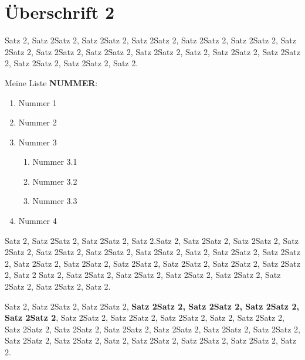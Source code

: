\section{Überschrift 2}

    Satz 2, Satz 2Satz 2, Satz 2Satz 2, Satz 2Satz 2, Satz 2Satz 2, Satz 2Satz 2, Satz 2Satz 2, Satz 2Satz 2, Satz 2Satz 2, Satz 2Satz 2, 
    Satz 2, Satz 2Satz 2, Satz 2Satz 2, Satz 2Satz 2, Satz 2Satz 2, Satz 2.

    Meine Liste \textbf{NUMMER}:
    \begin{enumerate}
        \item Nummer 1
        \item Nummer 2
        \item Nummer 3
        \begin{enumerate}
            \item Nummer 3.1
            \item Nummer 3.2
            \item Nummer 3.3
        \end{enumerate}
        \item Nummer 4
    \end{enumerate}

    Satz 2, Satz 2Satz 2, Satz 2Satz 2, Satz 2.Satz 2, Satz 2Satz 2, Satz 2Satz 2, Satz 2Satz 2, Satz 2Satz 2, Satz 2Satz 2, Satz 2Satz 2, 
    Satz 2, Satz 2Satz 2, Satz 2Satz 2, Satz 2Satz 2, Satz 2Satz 2, Satz 2Satz 2, Satz 2Satz 2, Satz 2Satz 2, Satz 2Satz 2, Satz 2
    Satz 2, Satz 2Satz 2, Satz 2Satz 2, Satz 2Satz 2, Satz 2Satz 2, Satz 2Satz 2, Satz 2Satz 2, Satz 2.


    Satz 2, Satz 2Satz 2, Satz 2Satz 2,  \textbf{Satz 2Satz 2, Satz 2Satz 2, Satz 2Satz 2, Satz 2Satz 2}, Satz 2Satz 2, Satz 2Satz 2, Satz 2Satz 2,
    Satz 2, Satz 2Satz 2, Satz 2Satz 2, Satz 2Satz 2, Satz 2Satz 2, Satz 2Satz 2, Satz 2Satz 2, Satz 2Satz 2, Satz 2Satz 2, Satz 2Satz 2, 
    Satz 2, Satz 2Satz 2, Satz 2Satz 2, Satz 2Satz 2, Satz 2.